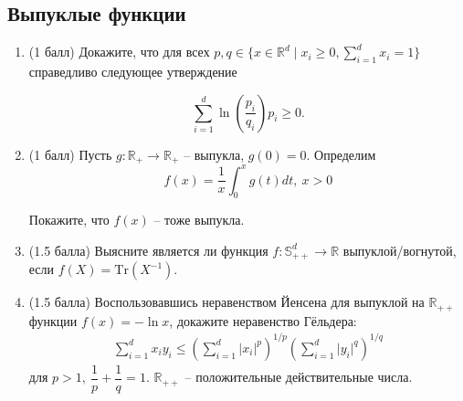 \documentclass[a5paper,twoside,russian,8pt]{article}
\begin{document}
\subsection*{Выпуклые функции}
\begin{enumerate}[label=\textbf{Задача \arabic*.}]

    \item (1 балл) Докажите, что для всех $p, q \in \{ x \in \mathbb{R}^d \mid x_i \geq 0, \sum\limits_{i=1}^d x_i = 1\}$ справедливо следующее утверждение

    $$
        \sum_{i=1}^d \ln\left( \frac{p_i}{q_i}\right) p_i \geq 0.
    $$

    \item (1 балл) Пусть $g: \mathbb{R}_+ \to \mathbb{R}_+$ -- выпукла, $g(0) = 0$. Определим 
    $$f(x) = \frac{1}{x}\int_0^xg(t)dt,~ x > 0$$

    Покажите, что $f(x)$ -- тоже выпукла.

    \item (1.5 балла) Выясните является ли функция $f: \mathbb{S}^d_{++} \to \mathbb{R}$ выпуклой/вогнутой, если $f(X) = \text{Tr}(X^{-1})$.

    \item (1.5 балла) Воспользовавшись неравенством Йенсена для выпуклой на $\mathbb{R}_{++}$ функции $f(x) = -\ln{x}$, докажите неравенство Гёльдера:
    \begin{align*}
        \sum\limits_{i=1}^d x_i y_i \le \left( \sum\limits_{i=1}^d \vert x_i\vert ^p\right)^{1/p} \left( \sum\limits_{i=1}^d \vert y_i\vert^q\right)^{1/q}
    \end{align*}
    для $p >1,\ \dfrac{1}{p} + \dfrac{1}{q} = 1$. $\mathbb{R}_{++}$ -- положительные действительные числа.
\end{enumerate}
\end{document}
